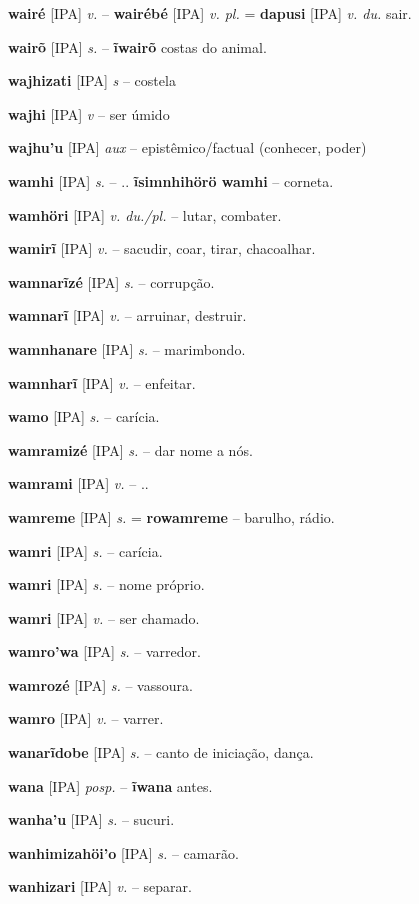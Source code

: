 \textbf{wairé} [IPA] \textit{v.} -- \textbf{wairébé} [IPA] \textit{v. pl.} = \textbf{dapusi} [IPA] \textit{v. du.} sair.

\textbf{wairõ} [IPA] \textit{s.} -- \textbf{ĩwairõ} costas do animal.

\textbf{wajhizati} [IPA] \textit{s} -- {costela}

\textbf{wajhi} [IPA] \textit{v} -- {ser úmido}

\textbf{wajhu'u} [IPA] \textit{aux} -- {epistêmico/factual (conhecer, poder)}

\textbf{wamhi} [IPA] \textit{s.} -- .. \textbf{ĩsimnhihörö wamhi} -- corneta.

\textbf{wamhöri} [IPA] \textit{v. du./pl.} -- lutar, combater.

\textbf{wamirĩ} [IPA] \textit{v.} -- sacudir, coar, tirar, chacoalhar.

\textbf{wamnarĩzé} [IPA] \textit{s.} -- corrupção.

\textbf{wamnarĩ} [IPA] \textit{v.} -- arruinar, destruir.

\textbf{wamnhanare} [IPA] \textit{s.} -- marimbondo.

\textbf{wamnharĩ} [IPA] \textit{v.} -- enfeitar.

\textbf{wamo} [IPA] \textit{s.} -- carícia.

\textbf{wamramizé} [IPA] \textit{s.} -- dar nome a nós.

\textbf{wamrami} [IPA] \textit{v.} -- ..

\textbf{wamreme} [IPA] \textit{s.} = \textbf{rowamreme} -- barulho, rádio.

\textbf{wamri} [IPA] \textit{s.} -- carícia.

\textbf{wamri} [IPA] \textit{s.} -- nome próprio.

\textbf{wamri} [IPA] \textit{v.} -- ser chamado.

\textbf{wamro'wa} [IPA] \textit{s.} -- varredor.

\textbf{wamrozé} [IPA] \textit{s.} -- vassoura.

\textbf{wamro} [IPA] \textit{v.} -- varrer.

\textbf{wanarĩdobe} [IPA] \textit{s.} -- canto de iniciação, dança.

\textbf{wana} [IPA] \textit{posp.} -- \textbf{ĩwana} antes.

\textbf{wanha'u} [IPA] \textit{s.} -- sucuri.

\textbf{wanhimizahöi'o} [IPA] \textit{s.} -- camarão.

\textbf{wanhizari} [IPA] \textit{v.} -- separar.

